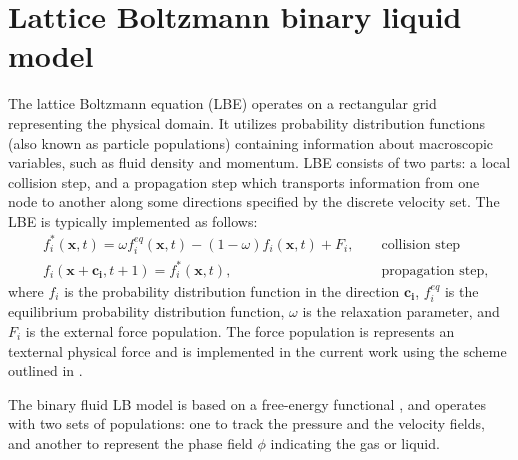 \documentclass[preprint,12pt]{elsarticle}
\begin{document}
\section{Lattice Boltzmann binary liquid model}
The lattice Boltzmann equation (LBE) operates on a rectangular grid representing the
physical domain. It utilizes
probability distribution functions (also known as particle populations)
containing information about
macroscopic variables, such as fluid density and momentum. LBE consists of
two parts: a local collision step, and a propagation step which transports
information from one node to another along some 
directions specified by the discrete velocity set.
The LBE is typically implemented as follows:
\begin{equation}
\label{standard:implementation}
\begin{aligned}
&f_i^{*}(\bm{x},t)=\omega f_i^{eq}(\bm{x},t)-(1-\omega) f_i(\bm{x},t) +
F_i,&&\text{ collision step}\\
&f_i(\bm{x}+\bm{c_i},t+1)=f_i^{*}(\bm{x},t),&&\text{ propagation step}, 
\end{aligned}
\end{equation}
where $f_i$ is the probability distribution function in the direction $\bm{c_i}$,
{\color{red} $f_i^{eq}$ is the equilibrium probability distribution function}, $\omega$ is the
relaxation parameter, and $F_i$ is the external force population. {\color{red} The force population
is represents an texternal physical force and is implemented in the current work using the scheme
outlined in \citet{guo}.} 

The binary fluid LB model is
based on a free-energy functional \cite{swift,landau}, and operates with two
sets of populations: one to track the pressure and the velocity fields, and another to represent the
phase field $\phi$ indicating the gas or liquid.
\end{document}
